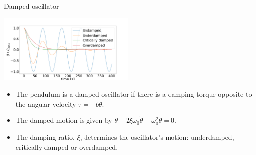 \documentclass{beamer}
\begin{document}
\begin{frame}{Damped oscillator}
	\begin{center}		
		\includegraphics[width=0.5\textwidth,keepaspectratio]{damp.png}
    \end{center}
	\begin{itemize}	
		\item The pendulum is a damped oscillator if there is a damping torque opposite to the angular velocity $\tau = -b\dot{\theta}$.
		\item The damped motion is given by $\ddot{\theta} + 2\xi\omega_0\dot{\theta} + \omega_0^2\theta = 0$.
		\item The damping ratio, $\xi$, determines the oscillator's motion: underdamped, critically damped or overdamped.
	\end{itemize}
	
	
\end{frame}
\end{document}
